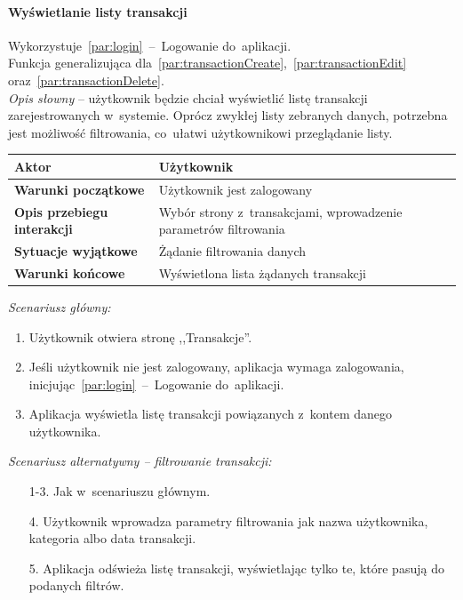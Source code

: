 \paragraph{Wyświetlanie listy transakcji\newline}
\label{par:transactionsView}
Wykorzystuje~\ref{par:login}~--~Logowanie do~aplikacji.\\
\indent Funkcja generalizująca dla~\ref{par:transactionCreate},~\ref{par:transactionEdit} oraz~\ref{par:transactionDelete}.\\

\textit{Opis słowny} -- użytkownik będzie chciał wyświetlić listę transakcji zarejestrowanych w~systemie. Oprócz zwykłej listy zebranych danych, potrzebna jest możliwość filtrowania, co~ułatwi użytkownikowi przeglądanie listy.

\begin{longtable}{|p{5cm}|p{7cm}|}
  \hline \textbf{Aktor} & Użytkownik \\
  \hline \textbf{Warunki początkowe} & Użytkownik jest zalogowany \\
  \hline \textbf{Opis przebiegu interakcji} & Wybór strony z~transakcjami, wprowadzenie parametrów filtrowania \\
  \hline \textbf{Sytuacje wyjątkowe} & Żądanie filtrowania danych \\
  \hline \textbf{Warunki końcowe} & Wyświetlona lista żądanych transakcji \\
  \hline
\end{longtable}

\noindent \textit{Scenariusz główny:}
\begin{enumerate}
  \item Użytkownik otwiera stronę ,,Transakcje''.
  \item Jeśli użytkownik nie jest zalogowany, aplikacja wymaga zalogowania, inicjując~\ref{par:login}~--~Logowanie do~aplikacji.
  \item Aplikacja wyświetla listę transakcji powiązanych z~kontem danego użytkownika.
\end{enumerate}

\noindent \textit{Scenariusz alternatywny -- filtrowanie transakcji:}
\begin{enumerate}
  \item[1-3.] Jak w~scenariuszu głównym.
  \item[4.] Użytkownik wprowadza parametry filtrowania jak nazwa użytkownika, kategoria albo data transakcji.
  \item[5.] Aplikacja odświeża listę transakcji, wyświetlając tylko te, które pasują do podanych filtrów.
\end{enumerate}

